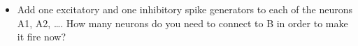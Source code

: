 \begin{Exercise}[title=Small Networks]
\begin{ExePart}
\begin{itemize}
\item Add one excitatory and one inhibitory spike generators to each of the neurons A1, A2, \dots. How many neurons do you need to connect to B in order to make it fire now?
\end{itemize}
\end{ExePart}



\end{Exercise}
